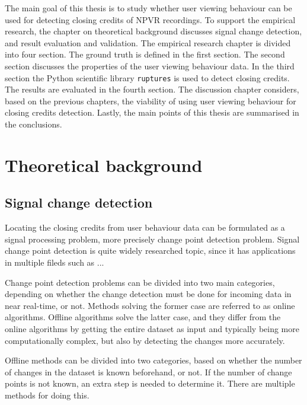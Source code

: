 The main goal of this thesis is to study whether user viewing behaviour can be used for detecting closing credits of NPVR recordings. To support the empirical research, the chapter on theoretical background discusses signal change detection, and result evaluation and validation. The empirical research chapter is divided into four section. The ground truth is defined in the first section. The second section discusses the properties of the user viewing behaviour data. In the third section the Python scientific library \texttt{ruptures} is used to detect closing credits. The results are evaluated in the fourth section. The discussion chapter considers, based on the previous chapters, the viability of using user viewing behaviour for closing credits detection. Lastly, the main points of this thesis are summarised in the conclusions.

\section{Theoretical background} \label{sec:background}

\subsection{Signal change detection} \label{subsec:methods} %


Locating the closing credits from user behaviour data can be formulated as a signal processing problem, more precisely change point detection problem. Signal change point detection is quite widely researched topic, since it has applications in multiple fileds such as ... %

Change point detection problems can be divided into two main categories, depending on whether the change detection must be done for incoming data in near real-time, or not. Methods solving the former case are referred to as online algorithms. Offline algorithms solve the latter case, and they differ from the online algorithms by getting the entire dataset as input and typically being more computationally complex, but also by detecting the changes more accurately.

Offline methods can be divided into two categories, based on whether the number of changes in the dataset is known beforehand, or not. If the number of change points is not known, an extra step is needed to determine it. There are multiple methods for doing this.


